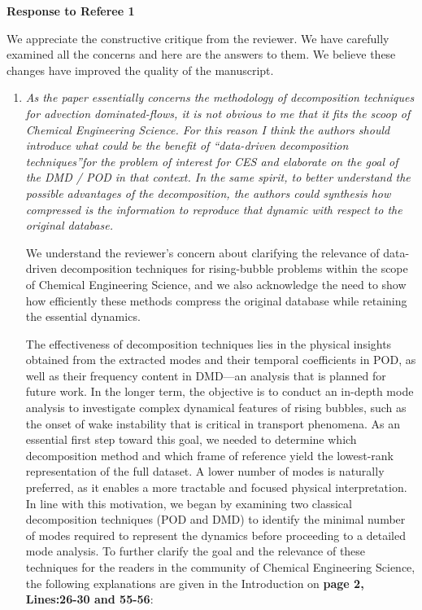 \documentclass[a4paper]{article}
\begin{document}
{\Large \bf {Response to Referee 1}}
\vspace{1cm}

{\textcolor{Olivegreen}{
We appreciate the constructive critique from the reviewer. We have carefully examined all the concerns and here are the answers to them. We believe these changes have improved the quality of the manuscript.
}}


\begin{enumerate}
\item
\textit{As the paper essentially concerns the methodology of decomposition techniques for advection dominated-flows, it is not obvious to me that it fits the scoop of Chemical Engineering Science. For this reason I think the authors should introduce what could be the benefit of ``data-driven decomposition techniques''for the problem of interest for CES and elaborate on the goal of the DMD / POD in that context. In the same spirit, to better understand the possible advantages of the decomposition, the authors could synthesis how compressed is the information to reproduce that dynamic with respect to the original database.}
\vspace{.2cm}

We understand the reviewer’s concern about clarifying the relevance of data-driven decomposition techniques for rising-bubble problems within the scope of Chemical Engineering Science, and we also acknowledge the need to show how efficiently these methods compress the original database while retaining the essential dynamics. 

The effectiveness of decomposition techniques lies in the physical insights obtained from the extracted modes and their temporal coefficients in POD, as well as their frequency content in DMD—an analysis that is planned for future work. In the longer term, the objective is to conduct an in-depth mode analysis to investigate complex dynamical features of rising bubbles, such as the onset of wake instability that is critical in transport phenomena. As an essential first step toward this goal, we needed to determine which decomposition method and which frame of reference yield the lowest-rank representation of the full dataset. A lower number of modes is naturally preferred, as it enables a more tractable and focused physical interpretation. In line with this motivation, we began by examining two classical decomposition techniques (POD and DMD) to identify the minimal number of modes required to represent the dynamics before proceeding to a detailed mode analysis. To further clarify the goal and the relevance of these techniques for the readers in the community of Chemical Engineering Science, the following explanations are given in the Introduction on \textbf{page 2, Lines:26-30 and 55-56}:


\end{enumerate}
\end{document}
